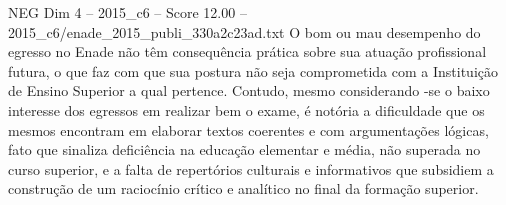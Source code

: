 \begin{textsample}{NEG Dim 4 – 2015\_c6 – Score 12.00 – 2015\_c6/enade\_2015\_publi\_330a2c23ad.txt}
O bom ou mau desempenho do egresso no Enade não têm consequência prática sobre sua atuação profissional futura, o que faz com que sua postura não seja comprometida com a Instituição de Ensino Superior a qual pertence.
Contudo, mesmo considerando -se o baixo interesse dos egressos em realizar bem o exame, é notória a dificuldade que os mesmos encontram em elaborar textos coerentes e com argumentações lógicas, fato que sinaliza deficiência na educação elementar e média, não superada no curso superior, e a falta de repertórios culturais e informativos que subsidiem a construção de um raciocínio crítico e analítico no final da formação superior.

\end{textsample}

